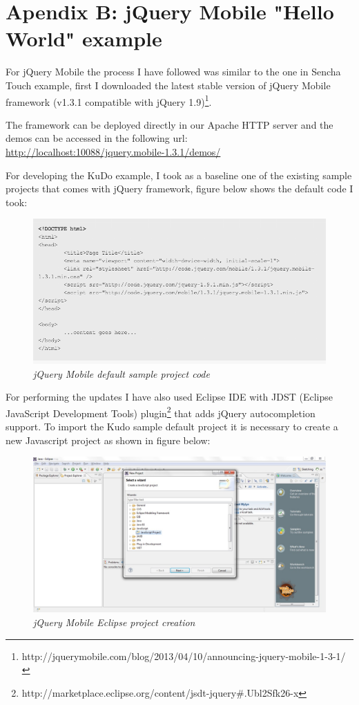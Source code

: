 \documentclass[a4paper,12pt]{book}
\begin{document}
\chapter{Apendix B: jQuery Mobile "Hello World" example}
\label{Apendix B: jQuery Mobile "Hello World" example}

For jQuery Mobile the process I have followed was similar to the one in Sencha Touch example, first I downloaded the latest stable version of jQuery Mobile framework (v1.3.1 compatible with jQuery 1.9)\footnote{http://jquerymobile.com/blog/2013/04/10/announcing-jquery-mobile-1-3-1/}.

The framework can be deployed directly in our Apache HTTP server and the demos can be accessed in the following url:\\

\url{http://localhost:10088/jquery.mobile-1.3.1/demos/}

For developing the KuDo example, I took as a baseline one of the existing sample projects that comes with jQuery framework, figure below shows the default code I took:

\begin{figure}[H]
    \centering
    \includegraphics[width=12cm, keepaspectratio]{img/jquery1.png}
    \caption{\textit{jQuery Mobile default sample project code}}
 \end{figure}
 
For performing the updates I have also used Eclipse IDE with JDST (Eclipse JavaScript Development Tools) plugin\footnote{http://marketplace.eclipse.org/content/jsdt-jquery\#.Ubl2Sfk26-x} that adds jQuery autocompletion support. To import the Kudo sample default project it is necessary to create a new Javascript project as shown in figure below:

\begin{figure}[H]
    \centering
    \includegraphics[width=12cm, keepaspectratio]{img/jquery3.png}
    \caption{\textit{jQuery Mobile Eclipse project creation}}
 \end{figure}
\end{document}
